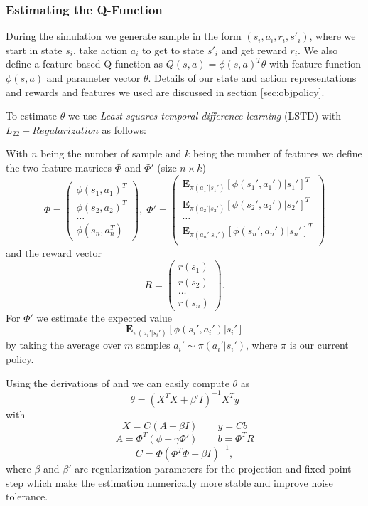 \documentclass[twoside]{article}
\begin{document}
\subsubsection{Estimating the Q-Function}
\label{sec:estimateq}

During the simulation we generate sample in the form $(s_i, a_i, r_i, s'_i)$,
where we start in state $s_i$, take action $a_i$ to get to state $s'_i$ and
get reward $r_i$. We also define a feature-based Q-function as $Q(s, a) =
\phi(s,a)^T \theta$ with feature function $\phi(s,a)$ and parameter vector
$\theta$. Details of our state and action representations and rewards and
features we used are discussed in section \ref{sec:objpolicy}.

To estimate $\theta$ we use \emph{Least-squares temporal difference
learning} (LSTD) with $L_{22}-Regularization$\cite{lstdRegularization} as
follows:

With $n$ being the number of sample and $k$ being the number of features
we define the two feature matrices $\Phi$ and $\Phi'$ (size $n\times k$)
$$
\Phi = \left(
\begin{array}{c}
    \phi(s_1,a_1)^T \\
    \phi(s_2,a_2)^T \\
    \dots \\
    \phi(s_n,a_n^T)
\end{array} \right), \;
\Phi' = \left(
\begin{array}{c}
    \mathbf{E}_{\pi(a_1'|s_1')} [\phi(s_1', a_1') | s_1']^T \\
    \mathbf{E}_{\pi(a_2'|s_2')} [\phi(s_2', a_2') | s_2']^T \\
    \dots \\
    \mathbf{E}_{\pi(a_n'|s_n')} [\phi(s_n', a_n') | s_n']^T \\
\end{array} \right)
$$
and the reward vector
$$
R = \left(
\begin{array}{c}
    r(s_1) \\
    r(s_2) \\
    \dots \\
    r(s_n)
\end{array} \right).
$$
For $\Phi'$ we estimate the expected value
$$
\mathbf{E}_{\pi(a_i'|s_i')} [\phi(s_i', a_i') | s_i']
$$
by taking the average over $m$ samples $a_i' \sim \pi(a_i'|s_i')$, where $\pi$
is our current policy.

Using the derivations of \cite{lspi} and \cite{lstdRegularization} we can easily
compute $\theta$ as
$$
\theta = (X^TX+\beta'I)^{-1}X^Ty
$$
with
$$X = C(A+\beta I) \qquad y=Cb$$
$$A = \Phi^T(\phi-\gamma \Phi') \qquad b=\Phi^T R$$
$$C = \Phi(\Phi^T\Phi+\beta I)^{-1},$$
where $\beta$ and $\beta'$ are regularization parameters for the projection and
fixed-point step which make the estimation numerically more stable and improve
noise tolerance.
\end{document}
